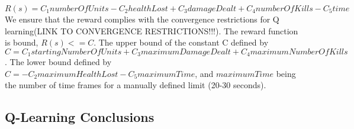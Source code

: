 $R(s) = C_1 numberOfUnits  -  C_2 healthLost  +   C_3 damageDealt  +   C_4 numberOfKills -  C_5 time$ \\ 

We ensure that the reward complies with the convergence restrictions for Q learning(LINK TO CONVERGENCE RESTRICTIONS!!!). The reward function is bound, $R(s) <= C$. The upper bound of the constant C defined by $C = C_1 startingNumberOfUnits  +   C_3 maximumDamageDealt  +   C_4 maximumNumberOfKills$. The lower bound defined by $C = -  C_2 maximumHealthLost -  C_5 maximumTime$, and $maximumTime$ being the number of time frames for a manually defined limit (20-30 seconds). 

\subsection{Q-Learning Conclusions}